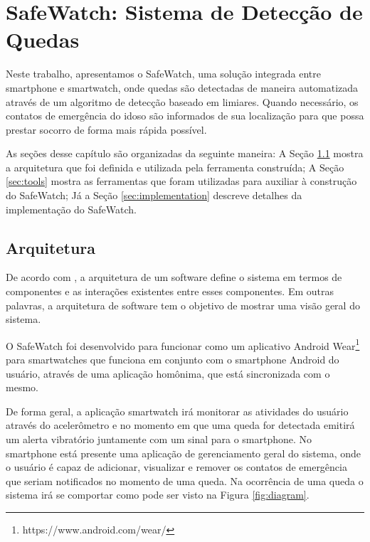 \chapter{SafeWatch: Sistema de Detecção de Quedas}
\label{cap:safeWatch}

Neste trabalho, apresentamos o SafeWatch, uma solução integrada entre smartphone e smartwatch, onde quedas são detectadas de maneira automatizada através de um algoritmo de detecção baseado em limiares. Quando necessário, os contatos de emergência do idoso são informados de sua localização para que possa prestar socorro de forma mais rápida possível. 

As seções desse capítulo são organizadas da seguinte maneira: A Seção \ref{sec:architecture} mostra a arquitetura que foi definida e utilizada pela ferramenta construída; A Seção \ref{sec:tools} mostra as ferramentas que foram utilizadas para auxiliar à construção do SafeWatch; Já a Seção \ref{sec:implementation} descreve detalhes da implementação do SafeWatch.



\section{Arquitetura}
\label{sec:architecture}

De acordo com \cite{garlan1993introduction}, a arquitetura de um software define o sistema em termos de componentes e as interações existentes entre esses componentes. Em outras palavras, a arquitetura de software tem o objetivo de mostrar uma visão geral do sistema. 

O SafeWatch foi desenvolvido para funcionar como um aplicativo Android Wear\footnote{https://www.android.com/wear/} para smartwatches que funciona em conjunto com o smartphone Android do usuário, através de uma aplicação homônima, que está sincronizada com o mesmo.

De forma geral, a aplicação smartwatch irá monitorar as atividades do usuário através do acelerômetro e no momento em que uma queda for detectada emitirá um alerta vibratório juntamente com um sinal para o smartphone. No smartphone está presente uma aplicação de gerenciamento geral do sistema, onde o usuário é capaz de adicionar, visualizar e remover os contatos de emergência que seriam notificados no momento de uma queda. Na ocorrência de uma queda o sistema irá se comportar como pode ser visto na Figura \ref{fig:diagram}.

